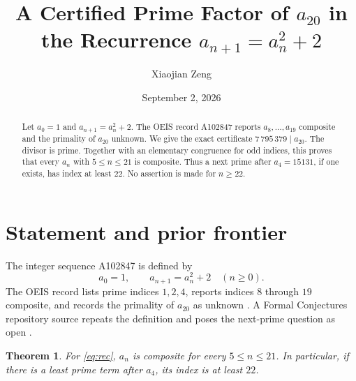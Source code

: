 \documentclass[11pt]{amsart}
\title{A Certified Prime Factor of \texorpdfstring{$a_{20}$}{a(20)} in the Recurrence \texorpdfstring{$a_{n+1}=a_n^2+2$}{a(n+1)=a(n) squared plus 2}}
\author{Xiaojian Zeng}\address{PBC School of Finance, Tsinghua University, 100190}\email{xiaojianzeng@foxmail.com}
\date{September 2, 2026}
\newtheorem{theorem}{Theorem}\newtheorem{lemma}[theorem]{Lemma}
\begin{document}
\begin{abstract}
Let $a_0=1$ and $a_{n+1}=a_n^2+2$. The OEIS record A102847 reports
$a_8,\ldots,a_{19}$ composite and the primality of $a_{20}$ unknown. We give
the exact certificate $7\,795\,379\mid a_{20}$. The divisor is prime. Together
with an elementary congruence for odd indices, this proves that every $a_n$ with
$5\le n\le21$ is composite. Thus a next prime after $a_4=15131$, if one
exists, has index at least $22$. No assertion is made for $n\ge22$.
\end{abstract}\maketitle
\section{Statement and prior frontier}
The integer sequence A102847 is defined by
\begin{equation}\label{eq:rec}a_0=1,\qquad a_{n+1}=a_n^2+2\quad(n\ge0).\end{equation}
The OEIS record lists prime indices $1,2,4$, reports indices $8$ through $19$
composite, and records the primality of $a_{20}$ as unknown \cite{OEIS102847}.
A Formal Conjectures repository source repeats the definition and poses the
next-prime question as open \cite{Formal102847}.
\begin{theorem}\label{thm:main}
For \eqref{eq:rec}, $a_n$ is composite for every $5\le n\le21$. In particular,
if there is a least prime term after $a_4$, its index is at least $22$.
\end{theorem}
\end{document}
